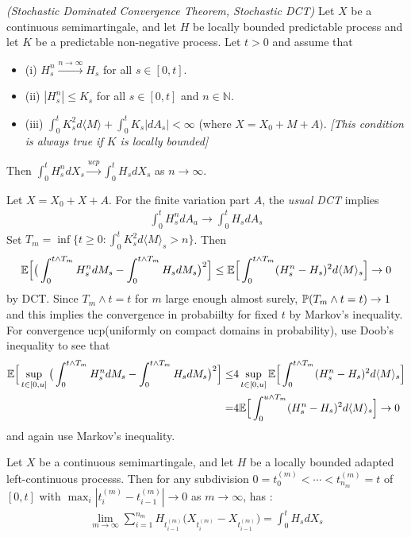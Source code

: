 \documentclass[12pt,a4paper]{article}
\newenvironment{proof}
{\begin{changemargin}{0.5cm}{0.5cm} 
	}%
	{\end{changemargin}
}
\renewenvironment{i}
{\begin{itemize} 
	}%
	{\end{itemize}
}
\newenvironment{p}
{\begin{proof} 
	}%
	{\end{proof}
}
\begin{document}
\prop \emph{(Stochastic Dominated Convergence Theorem, Stochastic DCT)} Let $X$ be a continuous semimartingale, and let $H$ be locally bounded predictable process and let $K$ be a predictable non-negative process. Let $t>0$ and assume that
\begin{i}
\item[(i)] $H_s^n \xrightarrow{n\rightarrow \infty} H_s$ for all $s\in [0,t]$.
\item[(ii)] $|H_s^n|\leq K_s$ for all $s\in [0, t]$ and $n\in \mathbb{N}$.
\item[(iii)] $\int_0^t K_s^2 d\langle M \rangle + \int_0^t K_s |dA_s| < \infty$ (where $X = X_0 + M +A)$. \emph{[This condition is always true if $K$ is locally bounded]}
\end{i}
Then $\int_0^t H_s^n dX_s \xrightarrow{ucp}\int_0^t H_s dX_s$ as $n\rightarrow \infty$.
\begin{p}
\pf Let $X= X_0 + X+A$. For the finite variation part $A$, the \emph{usual DCT} implies
\begin{align*}
\int_0^t H_s^n dA_a \rightarrow \int_0^t H_s dA_s
\end{align*}
Set $T_m = \inf \{t\geq 0 : \int_0^t K_s^2 d\langle M \rangle_s >n \}$. Then
\begin{align*}
\mathbb{E} \Big[ \big( \int_0^{t\wedge T_m} H_s^n dM_s - \int_0^{t\wedge T_m} H_s dM_s \big)^2 \Big] \leq \mathbb{E} \Big[ \int_0^{t\wedge T_m} (H_s^n - H_s)^2 d\langle M \rangle_s \Big] \rightarrow 0
\end{align*}
by DCT. Since $T_m \wedge t =t$ for $m$ large enough almost surely, $\mathbb{P} (T_m \wedge t =t) \rightarrow 1$ and this implies the convergence in probabiilty for fixed $t$ by Markov's inequality. For convergence ucp(uniformly on compact domains in probability), use Doob's inequality to see that
\begin{align*}
\mathbb{E} \Big[ \sup_{t\in [0,u]} \big( \int_0^{t\wedge T_m} H_s^n dM_s - \int_0^{t\wedge T_m} H_s dM_s \big)^2 \Big] \leq &  4 \sup_{t\in [0,u]} \mathbb{E} \Big[ \int_0^{t\wedge T_m} (H_s^n - H_s)^2 d\langle M \rangle_s \Big] \\
=& 4 \mathbb{E} \Big[ \int_0^{u\wedge T_m} (H_s^n - H_s)^2 d\langle M \rangle_s \Big] \rightarrow 0
\end{align*}
and again use Markov's inequality.
\eop
\end{p}
\s

\corr Let $X$ be a continuous semimartingale, and let $H$ be a locally bounded adapted left-continuous processs. Then for any subdivision $0 =t_0^{(m)} < \cdots < t_{n_m}^{(m)}=t$ of $[0,t]$ with $\max_i |t_i^{(m)} - t_{i-1}^{(m)}| \rightarrow 0$ as $m\rightarrow \infty$, has :
\begin{align*}
\lim_{m\rightarrow \infty} \sum_{i=1}^{n_m} H_{t_{i-1}^{(m)}} \big(X_{t_i^{(m)}} -X_{t_{i-1}^{(m)}} \big) = \int_0^t H_s dX_s
\end{align*}
\end{document}
